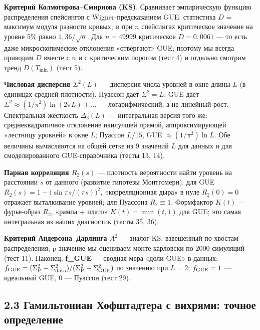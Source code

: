 \documentclass[
]{article}
\begin{document}
\textbf{Критерий Колмогорова--Смирнова (KS)}. Сравнивает эмпирическую
функцию распределения спейсингов с Wigner-предсказанием GUE: статистика
\(D\) = максимум модуля разности кривых, и при \(n\) спейсингах
критическое значение на уровне 5\% равно \(1{,}36/\sqrt{n}\). Для
\(n=49999\) критическое \(D = 0{,}0061\) --- то есть даже
микроскопические отклонения «отвергают» GUE; поэтому мы всегда приводим
\(D\) вместе с \(n\) и с критическим порогом (тест 4) и отдельно смотрим
тренд \(D(T_{\min})\) (тест 5).

\textbf{Числовая дисперсия \(\Sigma^2(L)\)} --- дисперсия числа уровней
в окне длины \(L\) (в единицах средней плотности). Пуассон даёт
\(\Sigma^2 = L\); GUE даёт
\(\Sigma^2 \approx (1/\pi^2)\ln(2\pi L) + \ldots\) --- логарифмический,
а не линейный рост. Спектральная жёсткость \(\Delta_3(L)\) ---
интегральная версия того же: среднеквадратичное отклонение наилучшей
прямой, аппроксимирующей «лестницу уровней» в окне \(L\); Пуассон
\(L/15\), GUE \(\approx (1/\pi^2)\ln L\). Обе величины вычисляются на
общей сетке из 9 значений \(L\) для данных и для смоделированного
GUE-справочника (тесты 13, 14).

\textbf{Парная корреляция \(R_2(s)\)} --- плотность вероятности найти
уровень на расстоянии \(s\) от данного (развитие гипотезы Монтгомери):
для GUE \(R_2(s) = 1 - \bigl(\sin \pi s/(\pi s)\bigr)^2\),
«корреляционная дыра» в нуле \(R_2(0)=0\) отражает выталкивание уровней;
для Пуассона \(R_2 \equiv 1\). Формфактор \(K(t)\) --- фурье-образ
\(R_2\), «рампа + плато» \(K(t)=\min(t,1)\) для GUE; это самая
интегральная из наших диагностик (тесты 35, 36).

\textbf{Критерий Андерсона--Дарлинга \(A^2\)} --- аналог KS, взвешенный
по хвостам распределения; p-значение мы оцениваем монте-карловски по
2000 симуляций (тест 11). Наконец, \textbf{f\_GUE} --- сводная мера
«доли GUE» в данных:
\(f_{\rm GUE} = (\Sigma^2_{\rm P} - \Sigma^2_{\rm data})/(\Sigma^2_{\rm P} - \Sigma^2_{\rm GUE})\)
по значению при \(L=2\); \(f_{\rm GUE}=1\) --- идеальный GUE, \(0\) ---
Пуассон (тест 29).

\subsection{2.3 Гамильтониан Хофштадтера с вихрями: точное
определение}\label{ux433ux430ux43cux438ux43bux44cux442ux43eux43dux438ux430ux43d-ux445ux43eux444ux448ux442ux430ux434ux442ux435ux440ux430-ux441-ux432ux438ux445ux440ux44fux43cux438-ux442ux43eux447ux43dux43eux435-ux43eux43fux440ux435ux434ux435ux43bux435ux43dux438ux435}
\end{document}

